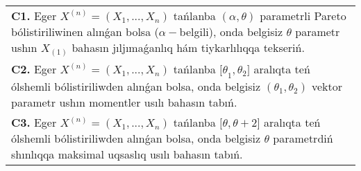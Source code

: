\documentclass{article}
\begin{document}
\begin{tabular}{m{17cm}}
\textbf{C1.} 
Eger \(X^{(n)} = \left( X_{1},...,X_{n} \right)\) tańlanba \((\alpha,\theta)\) parametrli Pareto bólistiriliwinen alınǵan bolsa (\(\alpha -\)belgili), onda belgisiz \(\theta\) parametr ushın \(X_{(1)}\) bahasın jıljımaǵanlıq hám tiykarlılıqqa tekseriń.
 \\
\textbf{C2.} 
Eger \(X^{(n)} = \left( X_{1},...,X_{n} \right)\) tańlanba \({\lbrack\theta}_{1},\theta_{2}\rbrack\) aralıqta teń ólshemli bólistiriliwden alınǵan bolsa, onda belgisiz \(\left( \theta_{1},\theta_{2} \right)\) vektor parametr ushın momentler usılı bahasın tabıń.
 \\
\textbf{C3.} 
Eger \(X^{(n)} = \left( X_{1},...,X_{n} \right)\) tańlanba \(\lbrack\theta,\theta + 2\rbrack\) aralıqta teń ólshemli bólistiriliwden alınǵan bolsa, onda belgisiz \(\theta\) parametrdiń shınlıqqa maksimal uqsaslıq usılı bahasın tabıń.
 \\

\end{tabular}
\vspace{1cm}
\end{document}
